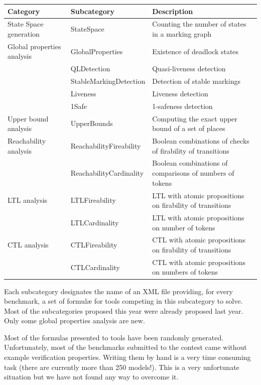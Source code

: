 \documentclass[10pt,english,a4paper]{article}
\makeatletter
\newcommand\ie               {i.e.\@\xspace}
\makeatother
\begin{document}
\begin{center}
\begin{tabular}{lll}
\toprule
{\bf Category} & {\bf Subcategory}                       & {\bf Description} \\
\midrule
State Space generation & StateSpace & Counting the number of states in a marking graph \\
\midrule
Global properties analysis & GlobalProperties           & Existence of deadlock states \\
& QLDetection                 & Quasi-liveness detection \\
& StableMarkingDetection      & Detection of stable markings \\
& Liveness                    & Liveness detection \\
& 1Safe                       & 1-safeness detection \\
\midrule
Upper bound analysis & UpperBounds                    & Computing the exact upper bound of a set of places \\
\midrule
Reachability analysis & ReachabilityFireability        & Boolean combinations of checks of firability of transitions \\
& ReachabilityCardinality        & Boolean combinations of comparisons of numbers of tokens\\
\midrule
LTL analysis & LTLFireability                 & LTL with atomic propositions on firability of transitions \\
& LTLCardinality                 & LTL with atomic propositions on number of tokens\\
\midrule
CTL analysis & CTLFireability                 & CTL with atomic propositions on firability of transitions \\
& CTLCardinality                 & CTL with atomic propositions on numbers of tokens\\
\bottomrule
\end{tabular}
\end{center}

Each subcategory designates the
name of an XML file providing, for every benchmark, a set of formulæ for
tools competing in this subcategory to solve.
%
Most of the subcategories proposed this year were already proposed last
year. Only some global properties analysis are new.

Most of the formulas presented to tools have been randomly generated.
Unfortunately, most of the benchmarks submitted to the contest came without
example verification properties.
Writing them by hand is a very time consuming task (there are currently more
than 250 models!).
This is a very unfortunate situation but we have not found any way to
overcome it.
\end{document}
